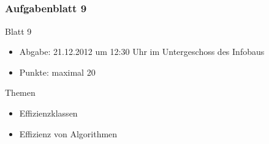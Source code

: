 \subsection*{}
\begin{frame}
	\frametitle{Aufgabenblatt 9}
	\begin{block}{Blatt 9}
		\begin{itemize}
			\item Abgabe: 21.12.2012 um 12:30 Uhr im Untergeschoss des Infobaus
			\item Punkte: maximal 20
		\end{itemize}
  	\end{block}
	\begin{block}{Themen}
		\begin{itemize}
			\item Effizienzklassen
			\item Effizienz von Algorithmen
	 	\end{itemize}
	\end{block}
\end{frame}
